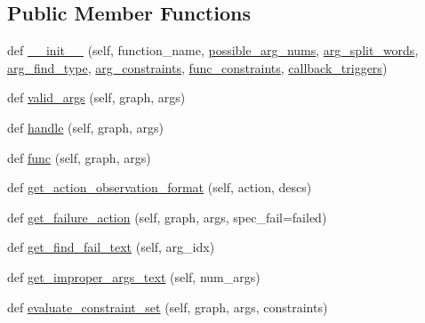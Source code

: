 \subsection*{Public Member Functions}
\begin{DoxyCompactItemize}
\item 
def \hyperlink{classlight__chats_1_1graph_1_1GraphFunction_afcb6dd9e771c4db34f5af22588e6190e}{\+\_\+\+\_\+init\+\_\+\+\_\+} (self, function\+\_\+name, \hyperlink{classlight__chats_1_1graph_1_1GraphFunction_a2d40c8aa5303afce9e93be14593fca78}{possible\+\_\+arg\+\_\+nums}, \hyperlink{classlight__chats_1_1graph_1_1GraphFunction_a20251500fbafb95c381e0c0bf9f37376}{arg\+\_\+split\+\_\+words}, \hyperlink{classlight__chats_1_1graph_1_1GraphFunction_a6845a255ccdfcaa58debca3157f7adb7}{arg\+\_\+find\+\_\+type}, \hyperlink{classlight__chats_1_1graph_1_1GraphFunction_a88e5637deee00b7f2f5d682afea0e85d}{arg\+\_\+constraints}, \hyperlink{classlight__chats_1_1graph_1_1GraphFunction_a46da34454c8776f43d4102c74a650334}{func\+\_\+constraints}, \hyperlink{classlight__chats_1_1graph_1_1GraphFunction_a5fc1640403f59d0358e1dccea3682487}{callback\+\_\+triggers})
\item 
def \hyperlink{classlight__chats_1_1graph_1_1GraphFunction_a8ac297dcadb1e5ec360f55f293dcbfcb}{valid\+\_\+args} (self, graph, args)
\item 
def \hyperlink{classlight__chats_1_1graph_1_1GraphFunction_a21e2dd1c8eb431b3ee22cce4853e3c15}{handle} (self, graph, args)
\item 
def \hyperlink{classlight__chats_1_1graph_1_1GraphFunction_a9fd67b8cadf1f9be60d4885d21287518}{func} (self, graph, args)
\item 
def \hyperlink{classlight__chats_1_1graph_1_1GraphFunction_a8828c59ad0d9f53bfb2234f0b8b37377}{get\+\_\+action\+\_\+observation\+\_\+format} (self, action, descs)
\item 
def \hyperlink{classlight__chats_1_1graph_1_1GraphFunction_ab20674b5c6c05a6c5188e51bc991717f}{get\+\_\+failure\+\_\+action} (self, graph, args, spec\+\_\+fail=\textquotesingle{}failed\textquotesingle{})
\item 
def \hyperlink{classlight__chats_1_1graph_1_1GraphFunction_a9c89db357c2eb4c4833d7f975df2e85d}{get\+\_\+find\+\_\+fail\+\_\+text} (self, arg\+\_\+idx)
\item 
def \hyperlink{classlight__chats_1_1graph_1_1GraphFunction_a4ffab7ed0e956a6bc76e3f61818ab5ff}{get\+\_\+improper\+\_\+args\+\_\+text} (self, num\+\_\+args)
\item 
def \hyperlink{classlight__chats_1_1graph_1_1GraphFunction_a2110ae09489d9ebc9291a1fd39d8c4cd}{evaluate\+\_\+constraint\+\_\+set} (self, graph, args, constraints)

\end{DoxyCompactItemize}
